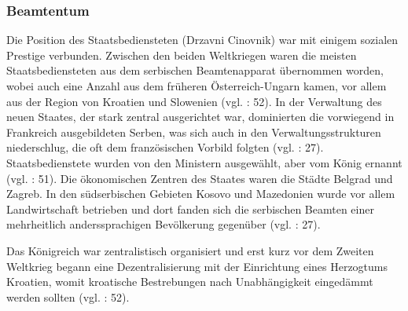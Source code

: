 \subsubsection{Beamtentum}
Die Position des Staatsbediensteten (Drzavni Cinovnik) war mit einigem sozialen Prestige verbunden. Zwischen den beiden Weltkriegen waren die meisten Staatsbediensteten aus dem serbischen Beamtenapparat übernommen worden, wobei auch eine Anzahl aus dem früheren Österreich-Ungarn kamen, vor allem aus der Region von Kroatien und Slowenien (vgl. \cite{sevic}: 52). In der Verwaltung des neuen Staates, der stark zentral ausgerichtet war, dominierten die vorwiegend in Frankreich ausgebildeten Serben, was sich auch in den Verwaltungsstrukturen niederschlug, die oft dem französischen Vorbild folgten (vgl. \cite{beardradin}: 27). Staatsbedienstete wurden von den Ministern ausgewählt, aber vom König ernannt (vgl. \cite{sevic}: 51). Die ökonomischen Zentren des Staates waren die Städte Belgrad und Zagreb. In den südserbischen Gebieten Kosovo und Mazedonien wurde vor allem Landwirtschaft betrieben und dort fanden sich die serbischen Beamten einer mehrheitlich anderssprachigen Bevölkerung gegenüber (vgl. \cite{beardradin}: 27).\par
Das Königreich war zentralistisch organisiert und erst kurz vor dem Zweiten Weltkrieg begann eine Dezentralisierung mit der Einrichtung eines Herzogtums Kroatien, womit kroatische Bestrebungen nach Unabhängigkeit eingedämmt werden sollten (vgl. \cite{sevic}: 52).\par

